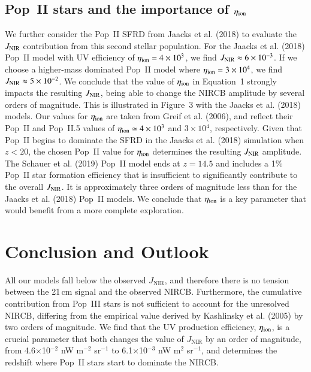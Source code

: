 \documentclass[11pt,twoside]{article}
\begin{document}
\subsection{Pop~II stars and the importance of $\eta_{\rm ion}$}
We further consider the Pop~II SFRD from Jaacks et al. (2018) to evaluate the $J_{\rm NIR}$ contribution from this second stellar population. For the Jaacks et al. (2018) Pop~II model with UV efficiency of $\eta_{\rm ion}=4\times 10{^3}$, we find $J_{\rm NIR}\approx 6\times 10^{-3}$. If we choose a higher-mass dominated Pop~II model where $\eta_{\rm ion}=3\times 10{^4}$, we find $J_{\rm NIR} \approx 
5\times 10^{-2}$. We conclude that the value of $\eta_{\rm ion}$ in Equation~1 strongly impacts the resulting $J_{\rm NIR}$, being able to change the NIRCB amplitude by several orders of magnitude. This is illustrated in Figure~3 with the Jaacks et al. (2018) models. Our values for $\eta_{\rm ion}$ are taken from Greif et al. (2006), and reflect their Pop~II and Pop~II.5 values of $\eta_{\rm ion}\simeq 4\times 10 {^3}$  and $3\times 10{^4}$, respectively. Given that Pop~II begins to dominate the SFRD in the Jaacks et al. (2018) simulation when $z < 20$, the chosen Pop~II value for $\eta_{\rm ion}$ determines the resulting $J_{\rm NIR}$ amplitude. The Schauer et al. (2019) Pop~II model ends at $z=14.5$ and includes a 1\%
Pop~II star formation efficiency that is insufficient to
significantly contribute to the overall $J_{\rm NIR}$. It is approximately three orders of magnitude less than for the Jaacks et al. (2018) Pop~II models. We conclude that $\eta_{\rm ion}$ is a key parameter that would benefit from a more complete exploration.  


\section{Conclusion and Outlook}

All our models fall below the observed $J_\mathrm{NIR}$, and therefore there is no tension between the 21\,cm signal and the observed NIRCB. Furthermore, the cumulative contribution from Pop~III stars is not sufficient to account for the unresolved NIRCB, differing from the empirical value derived by Kashlinsky et al. (2005) by two orders of magnitude. We find that the UV production efficiency, $\eta_{\rm ion}$, is a crucial parameter that both changes the value of $J_\mathrm{NIR}$ by an order of magnitude, from 4.6$\times$10$^{-2}$ nW m$^{-2}$ 
sr$^{-1}$ to 6.1$\times$10$^{-3}$ nW m$^{2}$ sr$^{-1}$, and determines the redshift where Pop~II stars start to dominate the NIRCB. 
\end{document}
